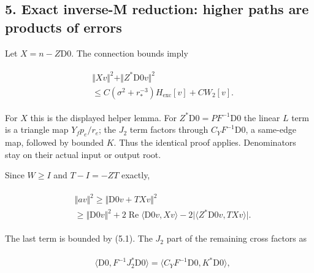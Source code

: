 \subsection{5. Exact inverse-M reduction: higher paths are products of
errors}\label{h-exact-inverse-m-reduction-higher-paths-are-products-of-errors}

Let \(X=n-Z\mathrm{D0}\). The connection bounds imply

\begin{gather*}
\begin{aligned}
& \Vert Xv\Vert ^{2}+\Vert Z^{*}\mathrm{D0}v\Vert ^{2} \\
& \le C( \sigma ^{2}+r_{*}^{-3})H_{\mathrm{exc}}[v]+CW_{2}[v].
\end{aligned}\tag{5.1}
\end{gather*}

For \(X\) this is the displayed helper lemma. For
\(Z^{*}\mathrm{D0}=P F^{-1}\mathrm{D0}\) the linear \(L\) term is a
triangle map \(Y_{f} p_{e}/r_{e}\); the \(J_{2}\) term factors through
\(C_{Y} F^{-1}\mathrm{D0}\), a same-edge map, followed by bounded \(K\).
Thus the identical proof applies. Denominators stay on their actual
input or output root.

Since \(W\ge I\) and \(T-I=-ZT\) exactly,

\begin{gather*}
\begin{aligned}
& \Vert av\Vert ^{2}\ge \Vert \mathrm{D0}v+TXv\Vert ^{2} \\
& \ge \Vert \mathrm{D0}v\Vert ^{2}+2\operatorname{Re} \langle \mathrm{D0}v,Xv\rangle -2\vert \langle Z^{*}\mathrm{D0}v,TXv\rangle \vert .
\end{aligned}\tag{5.2}
\end{gather*}

The last term is bounded by (5.1). The \(J_{2}\) part of the remaining
cross factors as

\begin{gather*}
\begin{aligned}
& \langle \mathrm{D0},F^{-1}J_{2}^{*}\mathrm{D0}\rangle =\langle C_{Y} F^{-1}\mathrm{D0},K^{*}\mathrm{D0}\rangle ,
\end{aligned}\tag{5.3}
\end{gather*}


